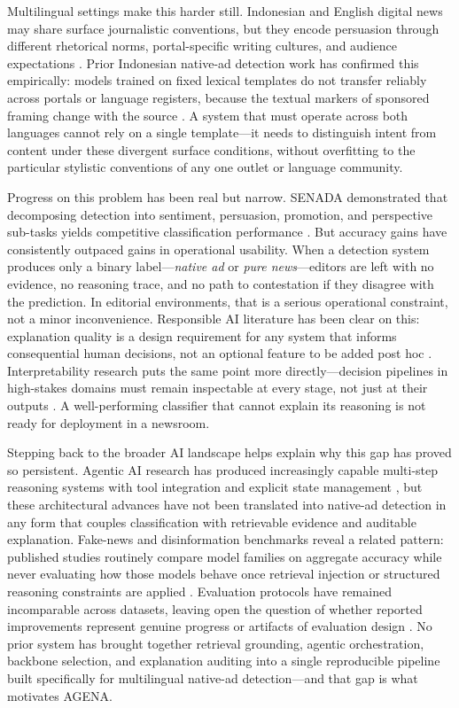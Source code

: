\documentclass{ieeeaccess}
\begin{document}
Multilingual settings make this harder still. Indonesian and English digital news may share surface journalistic conventions, but they encode persuasion through different rhetorical norms, portal-specific writing cultures, and audience expectations \cite{r7}. Prior Indonesian native-ad detection work has confirmed this empirically: models trained on fixed lexical templates do not transfer reliably across portals or language registers, because the textual markers of sponsored framing change with the source \cite{r8}. A system that must operate across both languages cannot rely on a single template—it needs to distinguish intent from content under these divergent surface conditions, without overfitting to the particular stylistic conventions of any one outlet or language community.

Progress on this problem has been real but narrow. SENADA demonstrated that decomposing detection into sentiment, persuasion, promotion, and perspective sub-tasks yields competitive classification performance \cite{r6}. But accuracy gains have consistently outpaced gains in operational usability. When a detection system produces only a binary label—\textit{native ad} or \textit{pure news}—editors are left with no evidence, no reasoning trace, and no path to contestation if they disagree with the prediction. In editorial environments, that is a serious operational constraint, not a minor inconvenience. Responsible AI literature has been clear on this: explanation quality is a design requirement for any system that informs consequential human decisions, not an optional feature to be added post hoc \cite{r11}. Interpretability research puts the same point more directly—decision pipelines in high-stakes domains must remain inspectable at every stage, not just at their outputs \cite{r12}. A well-performing classifier that cannot explain its reasoning is not ready for deployment in a newsroom.

Stepping back to the broader AI landscape helps explain why this gap has proved so persistent. Agentic AI research has produced increasingly capable multi-step reasoning systems with tool integration and explicit state management \cite{r13}, but these architectural advances have not been translated into native-ad detection in any form that couples classification with retrievable evidence and auditable explanation. Fake-news and disinformation benchmarks reveal a related pattern: published studies routinely compare model families on aggregate accuracy while never evaluating how those models behave once retrieval injection or structured reasoning constraints are applied \cite{r14}. Evaluation protocols have remained incomparable across datasets, leaving open the question of whether reported improvements represent genuine progress or artifacts of evaluation design \cite{r15}. No prior system has brought together retrieval grounding, agentic orchestration, backbone selection, and explanation auditing into a single reproducible pipeline built specifically for multilingual native-ad detection—and that gap is what motivates AGENA.
\end{document}
